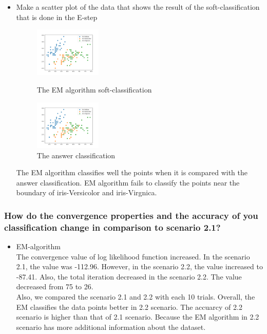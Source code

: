 \documentclass[a4paper]{article}
\begin{document}
\begin{itemize}
		\clearpage
		\item Make a scatter plot of the data that shows the result of the soft-classiﬁcation that is done in the E-step
		
		\begin{figure}[h]
			\begin{center}
				\includegraphics[width=0.3\textwidth]{4class.png}
				\caption{The EM algorithm soft-classification}
				\includegraphics[width=0.3\textwidth]{4_answer.png}
				\caption{The answer classification}
			\end{center}
		\end{figure}
		
		The EM algorithm classifies well the points when it is compared with the answer classification. EM algorithm fails to classify the points near the boundary of iris-Versicolor and iris-Virgnica.
		
	\end{itemize}
	\subsubsection{How do the convergence properties and the accuracy of you classiﬁcation change in comparison to scenario 2.1? }
	\begin{itemize}
		\item EM-algorithm \\
		The convergence value of log likelihood function increased. In the scenario 2.1, the value was -112.96. However, in the scenario 2.2, the value increased to -87.41. Also, the total iteration decreased in the scenario 2.2. The value decreased from 75 to 26.\\
		Also, we compared the scenario 2.1 and 2.2 with each 10 trials. Overall, the EM classifies the data points better in 2.2 scenario. The accuarcy of 2.2 scenario is higher than that of 2.1 scenario. Because the EM algorithm in 2.2 scenario has more additional information about the dataset.
		 
	\end{itemize}
	
\end{document}
